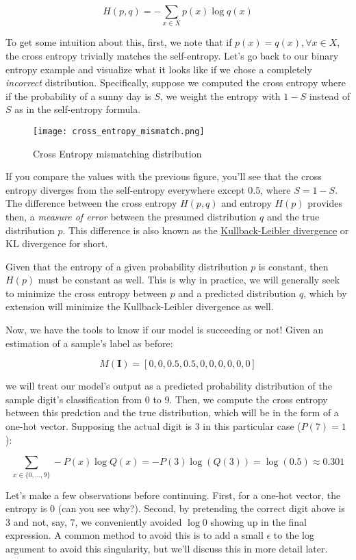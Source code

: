 \[H(p, q) = -\sum_{x \in X} p(x)\log q(x)\]

To get some intuition about this, first, we note that if
\(p(x) = q(x), \forall x\in X\), the cross entropy trivially matches the
self-entropy. Let's go back to our binary entropy example and visualize
what it looks like if we chose a completely \emph{incorrect}
distribution. Specifically, suppose we computed the cross entropy where
if the probability of a sunny day is \(S\), we weight the entropy with
\(1 - S\) instead of \(S\) as in the self-entropy formula.

\begin{figure}
	\centering
	\texttt{[image: cross\_entropy\_mismatch.png]}
	\caption{Cross Entropy mismatching distribution}
	\label{fig:cross_entropy_mismatch}
\end{figure}

If you compare the values with the previous figure, you'll see that the
cross entropy diverges from the self-entropy everywhere except \(0.5\),
where \(S = 1 - S\). The difference between the cross entropy
\(H(p, q)\) and entropy \(H(p)\) provides then, a \emph{measure of
	error} between the presumed distribution \(q\) and the true distribution
\(p\). This difference is also known as the
\href{https://en.wikipedia.org/wiki/Kullback\%E2\%80\%93Leibler_divergence}{Kullback-Leibler
	divergence} or KL divergence for short.

Given that the entropy of a given probability distribution \(p\) is
constant, then \(H(p)\) must be constant as well. This is why in
practice, we will generally seek to minimize the cross entropy between
\(p\) and a predicted distribution \(q\), which by extension will
minimize the Kullback-Leibler divergence as well.

Now, we have the tools to know if our model is succeeding or not! Given
an estimation of a sample's label as before:

\[M(\mathbf{I}) = \left[0, 0, 0.5, 0.5, 0, 0, 0, 0, 0, 0\right]\]

we will treat our model's output as a predicted probability distribution
of the sample digit's classification from 0 to 9. Then, we compute the
cross entropy between this predction and the true distribution, which
will be in the form of a one-hot vector. Supposing the actual digit is 3
in this particular case (\(P(7) = 1\)):

\[ \sum_{x\in \{0,\dots, 9\}} -P(x) \log Q(x) = -P(3) \log(Q(3)) = \log(0.5) \approx 0.301 \]

Let's make a few observations before continuing. First, for a one-hot
vector, the entropy is 0 (can you see why?). Second, by pretending the
correct digit above is \(3\) and not, say, \(7\), we conveniently
avoided \(\log 0\) showing up in the final expression. A common method
to avoid this is to add a small \(\epsilon\) to the log argument to
avoid this singularity, but we'll discuss this in more detail later.

